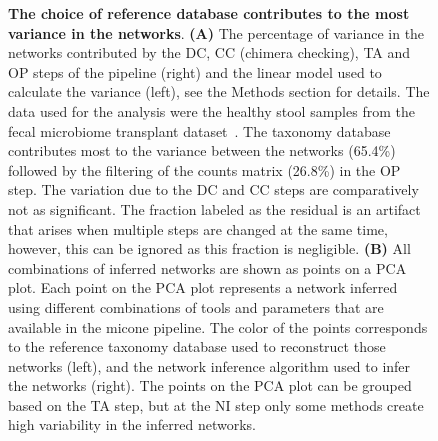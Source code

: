   \FloatBarrier
  \newpage
  \begin{figure}[H]
    \centering
      \caption{
      \textbf{The choice of reference database contributes to the most variance in the networks}.
      \textbf{(A)} The percentage of variance in the networks contributed by the DC, CC (chimera checking), TA and OP steps of the pipeline (right) and the linear model used to calculate the variance (left), see the Methods section for details.
      The data used for the analysis were the healthy stool samples from the fecal microbiome transplant dataset~\cite{Kang2017}.
      The taxonomy database contributes most to the variance between the networks (65.4\%) followed by the filtering of the counts matrix (26.8\%) in the OP step.
      The variation due to the DC and CC steps are comparatively not as significant.
      The fraction labeled as the residual is an artifact that arises when multiple steps are changed at the same time, however, this can be ignored as this fraction is negligible.
      \textbf{(B)} All combinations of inferred networks are shown as points on a PCA plot.
      Each point on the PCA plot represents a network inferred using different combinations of tools and parameters that are available in the \ac{micone} pipeline.
      The color of the points corresponds to the reference taxonomy database used to reconstruct those networks (left), and the network inference algorithm used to infer the networks (right).
      The points on the PCA plot can be grouped based on the TA step, but at the NI step only some methods create high variability in the inferred networks.
    }
    \label{fig:figure6}
  \end{figure}


